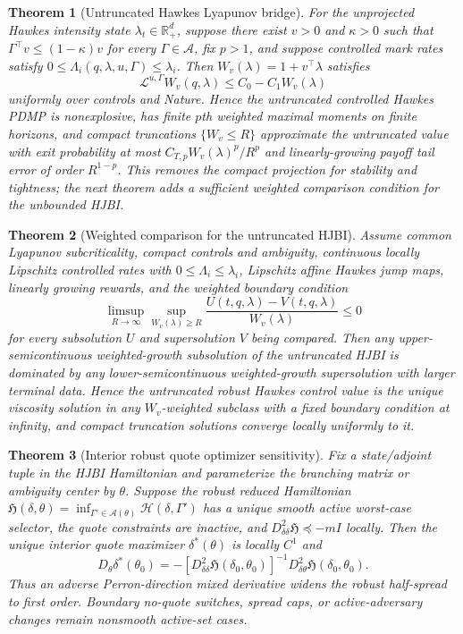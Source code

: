 \documentclass[review]{siamonline250211}
\newtheorem{theorem}{Theorem}
\newcommand{\R}{\mathbb{R}}
\begin{document}
\begin{theorem}[Untruncated Hawkes Lyapunov bridge]
For the unprojected Hawkes intensity state $\lambda_t\in\R_+^d$, suppose there
exist $v>0$ and $\kappa>0$ such that
$\Gamma^\top v\le(1-\kappa)v$ for every
$\Gamma\in\mathcal A$, fix $p>1$, and suppose controlled mark rates satisfy
$0\le\Lambda_i(q,\lambda,u,\Gamma)\le \lambda_i$. Then
$W_v(\lambda)=1+v^\top\lambda$ satisfies
\[
\mathcal L^{u,\Gamma}W_v(q,\lambda)
\le C_0-C_1W_v(\lambda)
\]
uniformly over controls and Nature. Hence the untruncated controlled Hawkes
PDMP is nonexplosive, has finite $p$th weighted maximal moments on finite
horizons, and compact truncations $\{W_v\le R\}$ approximate the untruncated
value with exit probability at most $C_{T,p}W_v(\lambda)^p/R^p$ and
linearly-growing payoff tail error of order $R^{1-p}$. This removes the compact
projection for stability and tightness; the next theorem adds a sufficient
weighted comparison condition for the unbounded HJBI.
\end{theorem}

\begin{theorem}[Weighted comparison for the untruncated HJBI]
Assume common Lyapunov subcriticality, compact controls and ambiguity,
continuous locally Lipschitz controlled rates with
$0\le\Lambda_i\le\lambda_i$, Lipschitz affine Hawkes jump maps, linearly
growing rewards, and the weighted boundary condition
\[
\limsup_{R\to\infty}
\sup_{W_v(\lambda)\ge R}
\frac{U(t,q,\lambda)-V(t,q,\lambda)}{W_v(\lambda)}\le 0
\]
for every subsolution $U$ and supersolution $V$ being compared. Then any
upper-semicontinuous weighted-growth subsolution of the untruncated HJBI is
dominated by any lower-semicontinuous weighted-growth supersolution with larger
terminal data. Hence the untruncated robust Hawkes control value is the unique
viscosity solution in any $W_v$-weighted subclass with a fixed boundary
condition at infinity, and compact truncation solutions converge locally
uniformly to it.
\end{theorem}

\begin{theorem}[Interior robust quote optimizer sensitivity]
Fix a state/adjoint tuple in the HJBI Hamiltonian and parameterize the
branching matrix or ambiguity center by $\theta$. Suppose the robust reduced
Hamiltonian
$\mathfrak H(\delta,\theta)=\inf_{\Gamma'\in\mathcal A(\theta)}
\mathcal H(\delta,\Gamma')$ has a unique smooth active worst-case selector,
the quote constraints are inactive, and
$D^2_{\delta\delta}\mathfrak H\preceq -mI$ locally. Then the unique interior
quote maximizer $\delta^*(\theta)$ is locally $C^1$ and
\[
D_\theta\delta^*(\theta_0)=
-\left[D^2_{\delta\delta}\mathfrak H(\delta_0,\theta_0)\right]^{-1}
D^2_{\delta\theta}\mathfrak H(\delta_0,\theta_0).
\]
Thus an adverse Perron-direction mixed derivative widens the robust
half-spread to first order. Boundary no-quote switches, spread caps, or
active-adversary changes remain nonsmooth active-set cases.
\end{theorem}
\end{document}

